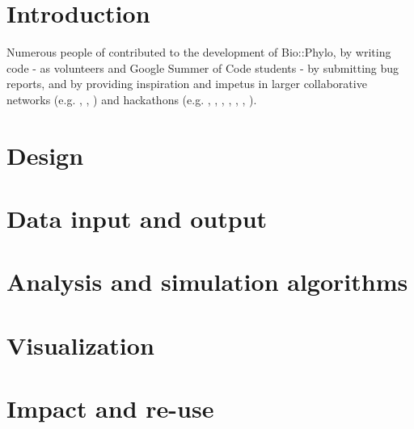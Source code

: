 \documentclass{bioinfo}
\begin{document}
\section{Introduction}


Numerous people of contributed to the development of Bio::Phylo, by writing code - as 
volunteers and Google Summer of Code students - by submitting bug reports, and by 
providing inspiration and impetus in larger collaborative networks (e.g. 
\cite{Stoltzfus2010}, \cite{Koureas2016}, \cite{Koureas2016a}) and hackathons (e.g. 
\citet{Lapp2007}, \citet{Katayama2010}, \citet{Katayama2011}, \citet{Katayama2013}, 
\citet{Stoltzfus2013}, \citet{Katayama2014}, \citet{Vos2014}).

\section{Design}



\section{Data input and output}



\section{Analysis and simulation algorithms}



\section{Visualization}




\section{Impact and re-use}


\end{document}
